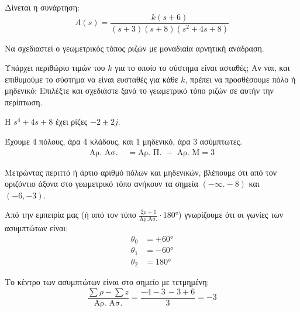 \documentclass[11pt,a4paper,notitlepage,fleqn,final]{article}
\begin{document}
\begin{exercise}
Δίνεται η συνάρτηση:
\[
A(s) = \frac{k(s+6)}{(s+3)(s+8)(s^2+4s+8)}
\]

Να σχεδιαστεί ο γεωμετρικός τόπος ριζών με μοναδιαία αρνητική ανάδραση.

Υπάρχει περιθώριο τιμών του \( k \) για το οποίο το σύστημα είναι ασταθές; Αν ναι, και επιθυμούμε το σύστημα να είναι ευσταθές για κάθε \( k \), πρέπει να προσθέσουμε πόλο ή
μηδενικό; Επιλέξτε και σχεδιάστε ξανά το γεωμετρικό τόπο ριζών σε αυτήν την περίπτωση.

\tcblower

Η \( s^4+4s+8 \) έχει ρίζες \( -2 \pm 2j\).

Έχουμε 4 πόλους, άρα 4 κλάδους, και 1 μηδενικό, άρα 3 ασύμπτωτες.
\begin{align*}
	\text{Αρ. Ασ. } &=\text{Αρ. Π. } - \text{ Αρ. Μ} = 3
\end{align*}

Μετρώντας περιττό ή άρτιο αριθμό πόλων και μηδενικών, βλέπουμε ότι από τον οριζόντιο άξονα
στο γεωμετρικό τόπο ανήκουν τα σημεία \( (-\infty.-8) \) και \( (-6,-3) \).

Από την εμπειρία μας (ή από τον τύπο \( \frac{2ρ+1}{\text{Αρ.Ασ.}}\cdot\ang{180} \)) γνωρίζουμε ότι οι γωνίες των ασυμπτώτων είναι:
\begin{align*}
	\theta_0 &= +\ang{60}\\
	\theta_1 &= -\ang{60}\\
	\theta_2 &= \ang{180}
\end{align*}

Το κέντρο των ασυμπτώτων είναι στο σημείο με τετμημένη:
\[
\frac{\sum ρ - \sum z}{\text{Αρ. Ασ.}}
= \frac{-4-3\,-3+6}{3} = -3
\]

\end{exercise}
\end{document}
